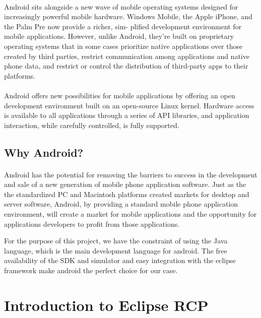 \documentclass[12pt,a4paper]{report}
\begin{document}
\paragraph{}
Android sits alongside a new wave of mobile operating systems designed for increasingly powerful
mobile hardware. Windows Mobile, the Apple iPhone, and the Palm Pre now provide a richer, sim-
plified development environment for mobile applications. However, unlike Android, they’re built on
proprietary operating systems that in some cases prioritize native applications over those created by
third parties, restrict communication among applications and native phone data, and restrict or control
the distribution of third-party apps to their platforms.
\paragraph{}
Android offers new possibilities for mobile applications by offering an open development environment
built on an open-source Linux kernel. Hardware access is available to all applications through a series
of API libraries, and application interaction, while carefully controlled, is fully supported.


\subsection{Why Android?}
\paragraph{}
Android has the potential for removing the barriers to success in the development and
sale of a new generation of mobile phone application software. Just as the the standardized 
PC and Macintosh platforms created markets for desktop and server software,
Android, by providing a standard mobile phone application environment, will create
a market for mobile applications and the opportunity for applications developers to
profit from those applications.

For the purpose of this project, we have the constraint of using the Java language, which is the main
development language for android. The free availability of the SDK and simulator and easy integration 
with the eclipse framework make android the perfect choice for our case.

\section{Introduction to Eclipse RCP}
\end{document}
